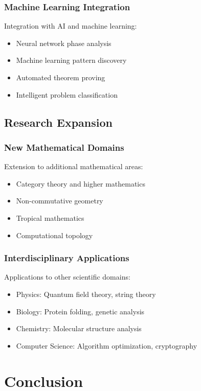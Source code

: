 \documentclass[12pt]{article}
\begin{document}
\subsubsection{Machine Learning Integration}

Integration with AI and machine learning:
\begin{itemize}
    \item Neural network phase analysis
    \item Machine learning pattern discovery
    \item Automated theorem proving
    \item Intelligent problem classification
\end{itemize}

\subsection{Research Expansion}

\subsubsection{New Mathematical Domains}

Extension to additional mathematical areas:
\begin{itemize}
    \item Category theory and higher mathematics
    \item Non-commutative geometry
    \item Tropical mathematics
    \item Computational topology
\end{itemize}

\subsubsection{Interdisciplinary Applications}

Applications to other scientific domains:
\begin{itemize}
    \item Physics: Quantum field theory, string theory
    \item Biology: Protein folding, genetic analysis
    \item Chemistry: Molecular structure analysis
    \item Computer Science: Algorithm optimization, cryptography
\end{itemize}

\section{Conclusion}
\end{document}
